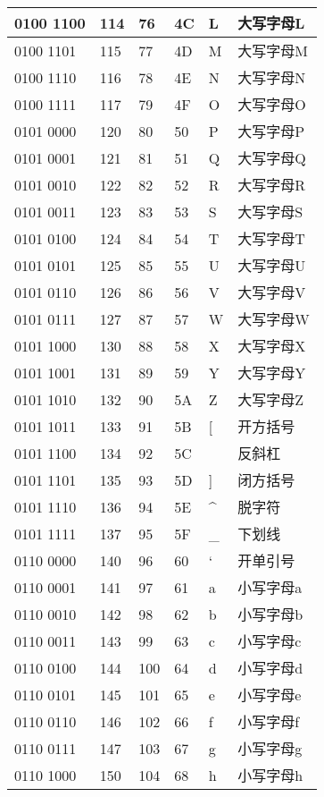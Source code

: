 \begin{longtable}{| p{.10\linewidth} | p{.08\linewidth} | p{.08\linewidth} | p{.10\linewidth} | p{.28\linewidth} | p{.15\linewidth} |}
0100 1100 & 114 & 76 & 4C & L & 大写字母L \\ \hline
0100 1101 & 115 & 77 & 4D & M & 大写字母M \\ \hline
0100 1110 & 116 & 78 & 4E & N & 大写字母N \\ \hline
0100 1111 & 117 & 79 & 4F & O & 大写字母O \\ \hline
0101 0000 & 120 & 80 & 50 & P & 大写字母P \\ \hline
0101 0001 & 121 & 81 & 51 & Q & 大写字母Q \\ \hline
0101 0010 & 122 & 82 & 52 & R & 大写字母R \\ \hline
0101 0011 & 123 & 83 & 53 & S & 大写字母S \\ \hline
0101 0100 & 124 & 84 & 54 & T & 大写字母T \\ \hline
0101 0101 & 125 & 85 & 55 & U & 大写字母U \\ \hline
0101 0110 & 126 & 86 & 56 & V & 大写字母V \\ \hline
0101 0111 & 127 & 87 & 57 & W & 大写字母W \\ \hline
0101 1000 & 130 & 88 & 58 & X & 大写字母X \\ \hline
0101 1001 & 131 & 89 & 59 & Y & 大写字母Y \\ \hline
0101 1010 & 132 & 90 & 5A & Z & 大写字母Z \\ \hline
0101 1011 & 133 & 91 & 5B & [ & 开方括号 \\ \hline
0101 1100 & 134 & 92 & 5C & \ & 反斜杠 \\ \hline
0101 1101 & 135 & 93 & 5D & ] & 闭方括号 \\ \hline
0101 1110 & 136 & 94 & 5E & \^ & 脱字符 \\ \hline
0101 1111 & 137 & 95 & 5F & \_ & 下划线 \\ \hline
0110 0000 & 140 & 96 & 60 & ` & 开单引号 \\ \hline
0110 0001 & 141 & 97 & 61 & a & 小写字母a \\ \hline
0110 0010 & 142 & 98 & 62 & b & 小写字母b \\ \hline
0110 0011 & 143 & 99 & 63 & c & 小写字母c \\ \hline
0110 0100 & 144 & 100 & 64 & d & 小写字母d \\ \hline
0110 0101 & 145 & 101 & 65 & e & 小写字母e \\ \hline
0110 0110 & 146 & 102 & 66 & f & 小写字母f \\ \hline
0110 0111 & 147 & 103 & 67 & g & 小写字母g \\ \hline
0110 1000 & 150 & 104 & 68 & h & 小写字母h \\ \hline

\end{longtable}
